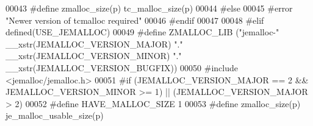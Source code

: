 \begin{DoxyCode}
00043 \textcolor{preprocessor}{#}\textcolor{preprocessor}{define} \textcolor{preprocessor}{zmalloc\_size}\textcolor{preprocessor}{(}\textcolor{preprocessor}{p}\textcolor{preprocessor}{)} \textcolor{preprocessor}{tc\_malloc\_size}\textcolor{preprocessor}{(}\textcolor{preprocessor}{p}\textcolor{preprocessor}{)}
00044 \textcolor{preprocessor}{#}\textcolor{preprocessor}{else}
00045 \textcolor{preprocessor}{#}\textcolor{preprocessor}{error} \textcolor{stringliteral}{"Newer version of tcmalloc required"}
00046 \textcolor{preprocessor}{#}\textcolor{preprocessor}{endif}
00047 
00048 \textcolor{preprocessor}{#}\textcolor{preprocessor}{elif} \textcolor{preprocessor}{defined}\textcolor{preprocessor}{(}\textcolor{preprocessor}{USE\_JEMALLOC}\textcolor{preprocessor}{)}
00049 \textcolor{preprocessor}{#}\textcolor{preprocessor}{define} \textcolor{preprocessor}{ZMALLOC\_LIB} \textcolor{preprocessor}{(}\textcolor{stringliteral}{"jemalloc-"} \textcolor{preprocessor}{\_\_xstr}\textcolor{preprocessor}{(}\textcolor{preprocessor}{JEMALLOC\_VERSION\_MAJOR}\textcolor{preprocessor}{)} \textcolor{stringliteral}{"."} \textcolor{preprocessor}{\_\_xstr}\textcolor{preprocessor}{(}\textcolor{preprocessor}{JEMALLOC\_VERSION\_MINOR}\textcolor{preprocessor}{)} \textcolor{stringliteral}{"."}
       \textcolor{preprocessor}{\_\_xstr}\textcolor{preprocessor}{(}\textcolor{preprocessor}{JEMALLOC\_VERSION\_BUGFIX}\textcolor{preprocessor}{)}\textcolor{preprocessor}{)}
00050 \textcolor{preprocessor}{#}\textcolor{preprocessor}{include} \textcolor{preprocessor}{<}\textcolor{preprocessor}{jemalloc}\textcolor{preprocessor}{/}\textcolor{preprocessor}{jemalloc}\textcolor{preprocessor}{.}\textcolor{preprocessor}{h}\textcolor{preprocessor}{>}
00051 \textcolor{preprocessor}{#}\textcolor{preprocessor}{if} \textcolor{preprocessor}{(}\textcolor{preprocessor}{JEMALLOC\_VERSION\_MAJOR} \textcolor{preprocessor}{==} 2 \textcolor{preprocessor}{&&} \textcolor{preprocessor}{JEMALLOC\_VERSION\_MINOR} \textcolor{preprocessor}{>=} 1\textcolor{preprocessor}{)} \textcolor{preprocessor}{||} \textcolor{preprocessor}{(}\textcolor{preprocessor}{JEMALLOC\_VERSION\_MAJOR} \textcolor{preprocessor}{>} 2\textcolor{preprocessor}{)}
00052 \textcolor{preprocessor}{#}\textcolor{preprocessor}{define} \textcolor{preprocessor}{HAVE\_MALLOC\_SIZE} 1
00053 \textcolor{preprocessor}{#}\textcolor{preprocessor}{define} \textcolor{preprocessor}{zmalloc\_size}\textcolor{preprocessor}{(}\textcolor{preprocessor}{p}\textcolor{preprocessor}{)} \textcolor{preprocessor}{je\_malloc\_usable\_size}\textcolor{preprocessor}{(}\textcolor{preprocessor}{p}\textcolor{preprocessor}{)}

\end{DoxyCode}
